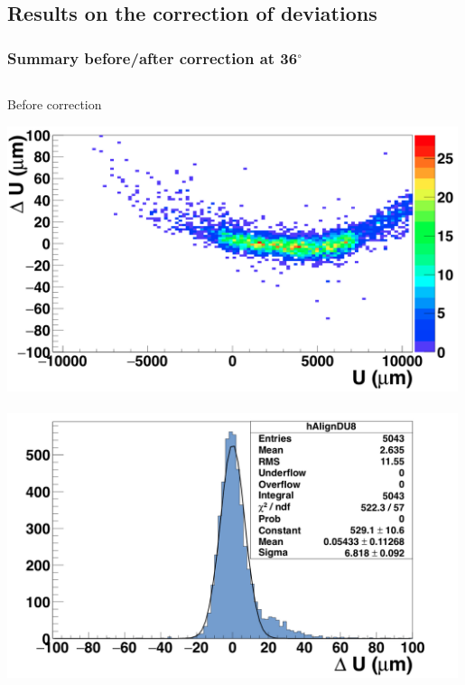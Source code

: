 \documentclass{beamer}
\newcommand{\degres}{\ensuremath{^\circ}}
\begin{document}
  \subsection{Results on the correction of deviations}
  \begin{frame}
    \frametitle{Summary before/after correction at 36\degres}

    \vspace{-0.35cm}
    \begin{columns}[c]
      \begin{column}{5cm}
        \begin{block}{Before correction}
          \begin{center}
            \includegraphics[width = 0.99\textwidth]{Pictures/deltaUU_8_deformed.png}
            \
            \includegraphics[width = 0.99\textwidth]{Pictures/deltaU_8_deformed.png}
          \end{center}

          \vspace{-0.54cm}
        \end{block}
      \end{column}


\end{columns}
\end{frame}
\end{document}
